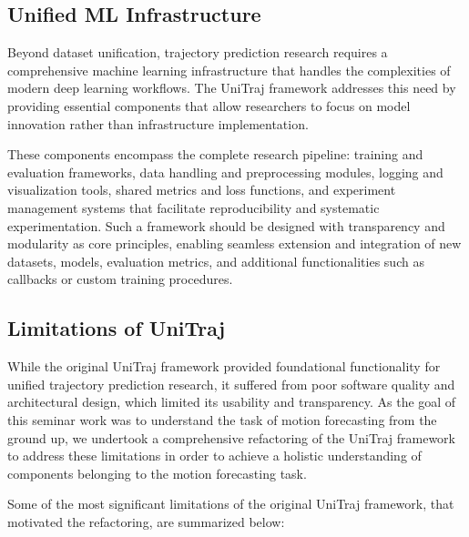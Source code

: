 \subsection{Unified ML Infrastructure}
Beyond dataset unification, trajectory prediction research requires a comprehensive machine learning infrastructure that handles the complexities of modern deep learning workflows. The UniTraj framework addresses this need by providing essential components that allow researchers to focus on model innovation rather than infrastructure implementation.

These components encompass the complete research pipeline: training and evaluation frameworks, data handling and preprocessing modules, logging and visualization tools, shared metrics and loss functions, and experiment management systems that facilitate reproducibility and systematic experimentation. Such a framework should be designed with transparency and modularity as core principles, enabling seamless extension and integration of new datasets, models, evaluation metrics, and additional functionalities such as callbacks or custom training procedures.



\subsection{Limitations of UniTraj}
\label{sec:data_challenges}

While the original UniTraj framework provided foundational functionality for unified trajectory prediction research, it suffered from poor software quality and architectural design, which limited its usability and transparency. As the goal of this seminar work was to understand the task of motion forecasting from the ground up, we undertook a comprehensive refactoring of the UniTraj framework to address these limitations in order to achieve a holistic understanding of components belonging to the motion forecasting task.

Some of the most significant limitations of the original UniTraj framework, that motivated the refactoring, are summarized below:

